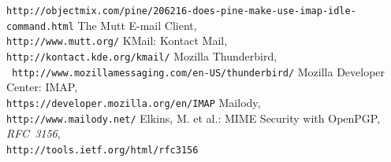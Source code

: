 \documentclass[12pt,notitlepage]{report}
\begin{document}
\begin{thebibliography}{99}
        {\tt http://objectmix.com/pine/206216-does-pine-make-use-imap-idle-command.html}
    The Mutt E-mail Client, \\
        {\tt http://www.mutt.org/}
    KMail: Kontact Mail, \\{\tt http://kontact.kde.org/kmail/}
    Mozilla Thunderbird, \\{\tt
        http://www.mozillamessaging.com/en-US/thunderbird/}
    Mozilla Developer Center: IMAP, \\
        {\tt https://developer.mozilla.org/en/IMAP}
    Mailody, \\{\tt http://www.mailody.net/}
    Elkins, M. et al.: MIME Security with OpenPGP,
        {\em RFC~3156}, \\
        {\tt http://tools.ietf.org/html/rfc3156}
\end{thebibliography}
\end{document}
